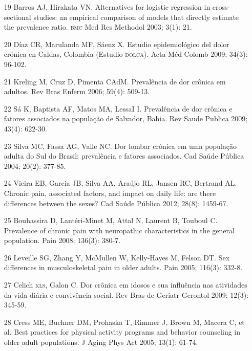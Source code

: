 \documentclass{article}
\begin{document}
\begin{itemize}
\item[19] Barros AJ, Hirakata VN. Alternatives for logistic regression in
cross-sectional studies: an empirical comparison of models that directly
estimate the prevalence ratio. \textsc{bmc} Med Res Methodol 2003; 3(1): 21.

\item[20] Díaz CR, Marulanda MF, Sáenz X. Estudio epidemiológico del dolor
crónica en Caldas, Colombia (Estudio \textsc{dolca}). Acta Méd Colomb 2009; 34(3):
96-102.

\item[21] Kreling M, Cruz D, Pimenta CAdM. Prevalência de dor crônica em
adultos. Rev Bras Enferm 2006; 59(4): 509-13.

\item[22] Sá K, Baptista AF, Matos MA, LessaI I. Prevalência de dor crônica
e fatores associados na população de Salvador, Bahia. Rev Saude Publica 2009;
43(4): 622-30.

\item[23] Silva MC, Fassa AG, Valle NC. Dor lombar crônica em uma população
adulta do Sul do Brasil: prevalência e fatores associados. Cad Saúde Pública
2004; 20(2): 377-85.

\item[24] Vieira EB, Garcia JB, Silva AA, Araújo RL, Jansen RC, Bertrand AL.
Chronic pain, associated factors, and impact on daily life: are there
differences between the sexes? Cad Saúde Pública 2012; 28(8): 1459-67.

\item[25] Bouhassira D, Lantéri-Minet M, Attal N, Laurent B, Touboul C.
Prevalence of chronic pain with neuropathic characteristics in the general
population. Pain 2008; 136(3): 380-7.

\item[26] Leveille SG, Zhang Y, McMullen W, Kelly-Hayes M, Felson DT. Sex
differences in musculoskeletal pain in older adults. Pain 2005; 116(3): 332-8.

\item[27] Celich \textsc{kls}, Galon C. Dor crônica em idosos e sua influência nas
atividades da vida diária e convivência social. Rev Bras de Geriatr Gerontol
2009; 12(3): 345-59.

\item[28] Cress ME, Buchner DM, Prohaska T, Rimmer J, Brown M, Macera C, et
al. Best practices for physical activity programs and behavior counseling in
older adult populations. J Aging Phys Act 2005; 13(1): 61-74.


\end{itemize}
\end{document}

